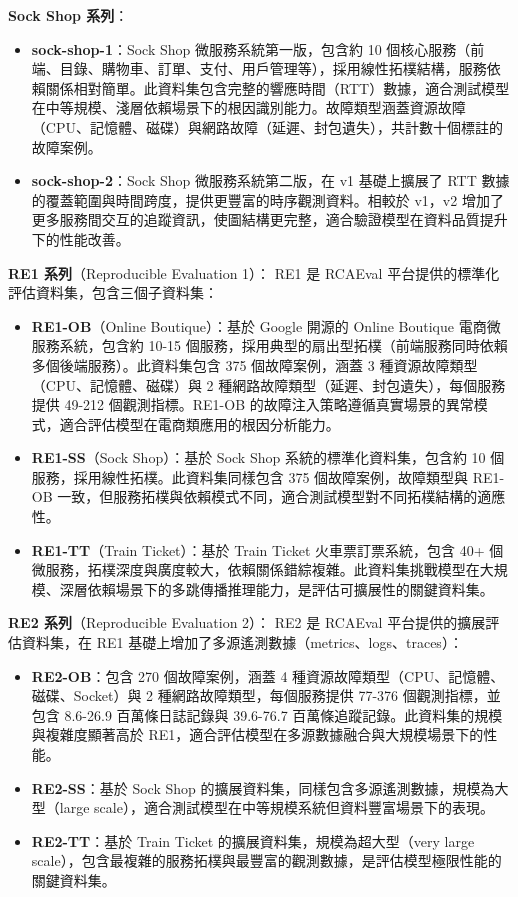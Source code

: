 \documentclass[10pt,a4paper,twocolumn]{article}
\begin{document}
\textbf{Sock Shop 系列}：
\begin{itemize}
\item \textbf{sock-shop-1}：Sock Shop 微服務系統第一版，包含約 10 個核心服務（前端、目錄、購物車、訂單、支付、用戶管理等），採用線性拓樸結構，服務依賴關係相對簡單。此資料集包含完整的響應時間（RTT）數據，適合測試模型在中等規模、淺層依賴場景下的根因識別能力。故障類型涵蓋資源故障（CPU、記憶體、磁碟）與網路故障（延遲、封包遺失），共計數十個標註的故障案例。
\item \textbf{sock-shop-2}：Sock Shop 微服務系統第二版，在 v1 基礎上擴展了 RTT 數據的覆蓋範圍與時間跨度，提供更豐富的時序觀測資料。相較於 v1，v2 增加了更多服務間交互的追蹤資訊，使圖結構更完整，適合驗證模型在資料品質提升下的性能改善。
\end{itemize}

\textbf{RE1 系列}（Reproducible Evaluation 1）：
RE1 是 RCAEval 平台提供的標準化評估資料集，包含三個子資料集：
\begin{itemize}
\item \textbf{RE1-OB}（Online Boutique）：基於 Google 開源的 Online Boutique 電商微服務系統，包含約 10-15 個服務，採用典型的扇出型拓樸（前端服務同時依賴多個後端服務）。此資料集包含 375 個故障案例，涵蓋 3 種資源故障類型（CPU、記憶體、磁碟）與 2 種網路故障類型（延遲、封包遺失），每個服務提供 49-212 個觀測指標。RE1-OB 的故障注入策略遵循真實場景的異常模式，適合評估模型在電商類應用的根因分析能力。
\item \textbf{RE1-SS}（Sock Shop）：基於 Sock Shop 系統的標準化資料集，包含約 10 個服務，採用線性拓樸。此資料集同樣包含 375 個故障案例，故障類型與 RE1-OB 一致，但服務拓樸與依賴模式不同，適合測試模型對不同拓樸結構的適應性。
\item \textbf{RE1-TT}（Train Ticket）：基於 Train Ticket 火車票訂票系統，包含 40+ 個微服務，拓樸深度與廣度較大，依賴關係錯綜複雜。此資料集挑戰模型在大規模、深層依賴場景下的多跳傳播推理能力，是評估可擴展性的關鍵資料集。
\end{itemize}

\textbf{RE2 系列}（Reproducible Evaluation 2）：
RE2 是 RCAEval 平台提供的擴展評估資料集，在 RE1 基礎上增加了多源遙測數據（metrics、logs、traces）：
\begin{itemize}
\item \textbf{RE2-OB}：包含 270 個故障案例，涵蓋 4 種資源故障類型（CPU、記憶體、磁碟、Socket）與 2 種網路故障類型，每個服務提供 77-376 個觀測指標，並包含 8.6-26.9 百萬條日誌記錄與 39.6-76.7 百萬條追蹤記錄。此資料集的規模與複雜度顯著高於 RE1，適合評估模型在多源數據融合與大規模場景下的性能。
\item \textbf{RE2-SS}：基於 Sock Shop 的擴展資料集，同樣包含多源遙測數據，規模為大型（large scale），適合測試模型在中等規模系統但資料豐富場景下的表現。
\item \textbf{RE2-TT}：基於 Train Ticket 的擴展資料集，規模為超大型（very large scale），包含最複雜的服務拓樸與最豐富的觀測數據，是評估模型極限性能的關鍵資料集。
\end{itemize}
\end{document}

